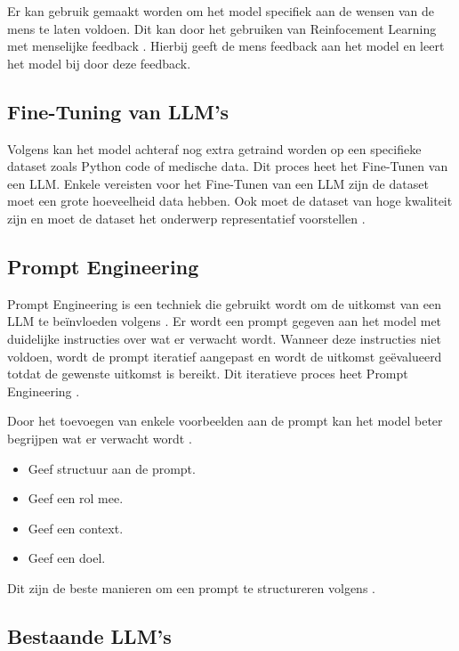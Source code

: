 Er kan gebruik gemaakt worden om het model specifiek aan de wensen van de mens te laten voldoen. Dit kan door het gebruiken van Reinfocement Learning met menselijke feedback \autocite{LambertEtAL2022}. 
Hierbij geeft de mens feedback aan het model en leert het model bij door deze feedback.

\subsection{Fine-Tuning van LLM's}
\label{sec:fine-tuning-van-llms}

Volgens \textcite{Peckham2024} kan het model achteraf nog extra getraind worden op een specifieke dataset zoals Python code of medische data.
Dit proces heet het Fine-Tunen van een LLM.
Enkele vereisten voor het Fine-Tunen van een LLM zijn de dataset moet een grote hoeveelheid data hebben.
Ook moet de dataset van hoge kwaliteit zijn en moet de dataset het onderwerp representatief voorstellen \autocite{Peckham2024}.

\subsection{Prompt Engineering}
\label{sec:prompt-engineering}

Prompt Engineering is een techniek die gebruikt wordt om de uitkomst van een LLM te beïnvloeden volgens \textcite{Google2023}.
Er wordt een prompt gegeven aan het model met duidelijke instructies over wat er verwacht wordt. 
Wanneer deze instructies niet voldoen, wordt de prompt iteratief aangepast en wordt de uitkomst geëvalueerd totdat de gewenste uitkomst is bereikt.
Dit iteratieve proces heet Prompt Engineering \autocite{Trad2024}.

Door het toevoegen van enkele voorbeelden aan de prompt kan het model beter begrijpen wat er verwacht wordt \autocite{OpenAi2024a}.
\begin{itemize}
  \item Geef structuur aan de prompt.
  \item Geef een rol mee.
  \item Geef een context.
  \item Geef een doel.
\end{itemize} 
Dit zijn de beste manieren om een prompt te structureren volgens \autocite{Google2023}.

\subsection{Bestaande LLM's}
\label{sec:bestaande-llms}

